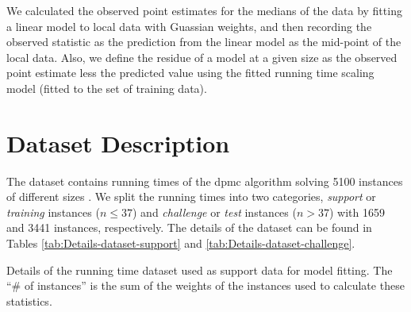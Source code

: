 We calculated the observed point estimates for the medians of the
data by fitting a linear model to local data with Guassian weights, and
then recording the observed statistic as the prediction from the linear
model as the mid-point of the local data.
Also, we define the residue of a model at a given size as the observed
point estimate less the
predicted value using the fitted running time scaling model (fitted to
the set of training data).


\section{Dataset Description}

The dataset contains running times of the dpmc algorithm solving
5100 instances of different sizes . We split the
running times into two categories, \emph{support} or \emph{training}
instances ($n\leq37$) and \emph{challenge} or
\emph{test} instances ($n>37$) with 1659
and 3441 instances, respectively. The
details of the dataset can be found in Tables \ref{tab:Details-dataset-support}
and \ref{tab:Details-dataset-challenge}.
\begin{table*}
\noindent \begin{centering}

\par\end{centering}

\caption{\label{tab:Details-dataset-support} Details of the running time
dataset used as support data for model fitting.
 The ``\# of instances'' is the
sum of the weights of the instances used to calculate these statistics.}
\end{table*}

